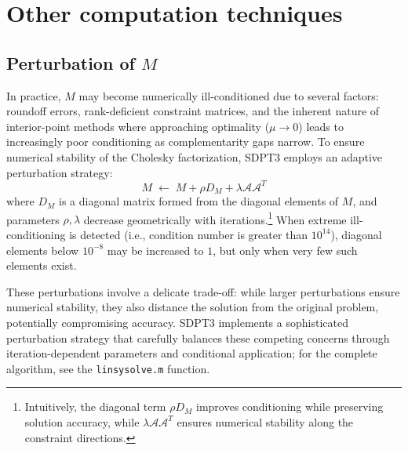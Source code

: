 \section{Other computation techniques}
\subsection{Perturbation of \boldmath $M$ }
In practice, $M$ may become numerically ill-conditioned due to several factors: roundoff errors, rank-deficient constraint matrices, and the inherent nature of interior-point methods where approaching optimality ($\mu \to 0$) leads to increasingly poor conditioning as complementarity gaps narrow.
To ensure numerical stability of the Cholesky factorization, SDPT3 employs an adaptive perturbation strategy:
\[
  M \;\leftarrow\; M + \rho D_M + \lambda \mathcal{A}\mathcal{A}^T
\]
where $D_M$ is a diagonal matrix formed from the diagonal elements of $M$, and parameters $\rho, \lambda$ decrease geometrically with iterations.\footnote{
  Intuitively, the diagonal term $\rho D_M$ improves conditioning while preserving solution accuracy, while $\lambda \mathcal{A}\mathcal{A}^T$ ensures numerical stability along the constraint directions.
}
When extreme ill-conditioning is detected (i.e., condition number is greater than $10^{14}$), diagonal elements below $10^{-8}$ may be increased to $1$, but only when very few such elements exist.

These perturbations involve a delicate trade-off: while larger perturbations ensure numerical stability, they also distance the solution from the original problem, potentially compromising accuracy. SDPT3 implements a sophisticated perturbation strategy that carefully balances these competing concerns through iteration-dependent parameters and conditional application; for the complete algorithm, see the \texttt{linsysolve.m} function.



